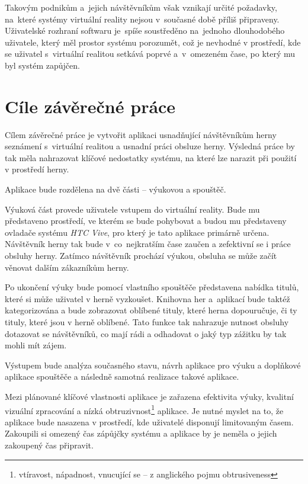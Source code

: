 \documentclass[12pt, a4paper]{article}
\begin{document}
Takovým podnikům a~jejich návštěvníkům však vznikají určité požadavky, na~které systémy virtuální reality nejsou v~současné době příliš připraveny. Uživatelské rozhraní softwaru je~spíše soustředěno na~jednoho dlouhodobého uživatele, který měl prostor systému porozumět, což je nevhodné v prostředí, kde se uživatel s~virtuální realitou setkává poprvé a~v~omezeném čase, po který mu byl systém zapůjčen.

\section{Cíle závěrečné práce}

Cílem závěrečné práce je vytvořit aplikaci usnadňující návštěvníkům herny seznámení s~virtuální realitou a usnadní práci obsluze herny. Výsledná práce by tak měla nahrazovat klíčové nedostatky systému, na které lze narazit při použití v prostředí herny.

Aplikace bude rozdělena na dvě části -- výukovou a spouštěč.

Výuková část provede uživatele vstupem do virtuální reality. Bude mu představeno prostředí, ve kterém se bude pohybovat a budou mu představeny ovladače systému \textit{HTC Vive}, pro který je tato aplikace primárně určena. Návštěvník herny tak bude v~co~nejkratším čase zaučen a zefektivní se i práce obsluhy herny. Zatímco návštěvník prochází výukou, obsluha se může začít věnovat dalším zákazníkům herny.

Po ukončení výuky bude pomocí vlastního spouštěče představena nabídka titulů, které si může uživatel v herně vyzkoušet. Knihovna her a~aplikací bude taktéž kategorizována a bude zobrazovat oblíbené tituly, které herna dopouručuje, či ty tituly, které jsou v herně oblíbené. Tato funkce tak nahrazuje nutnost obsluhy dotazovat se návštěvníků, co mají rádi a odhadovat o jaký typ zážitku by tak mohli mít zájem.

Výstupem bude analýza současného stavu, návrh aplikace pro výuku a doplňkové aplikace spouštěče a následně samotná realizace takové aplikace.

Mezi plánované klíčové vlastnosti aplikace je zařazena efektivita výuky, kvalitní vizuální zpracování a nízká obtruzivnost\footnote{vtíravost, nápadnost, vnucující se -- z anglického pojmu obtrusiveness} aplikace. Je nutné myslet na to, že aplikace bude nasazena v prostředí, kde uživatelé disponují limitovaným časem. Zakoupili si omezený čas zápůjčky systému a aplikace by je neměla o jejich zakoupený čas připravit.
\end{document}
